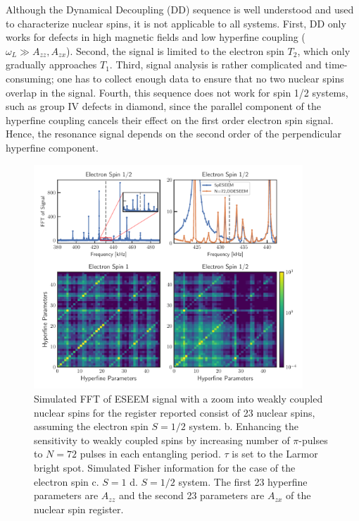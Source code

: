 \documentclass[%
 reprint,
superscriptaddress,
 amsmath,amssymb,
 aps,
]{revtex4-2}
\begin{document}
Although the Dynamical Decoupling (DD) sequence is well understood and used to characterize nuclear spins, it is not applicable to all systems.
First, DD only works for defects in high magnetic fields and low hyperfine coupling ($\omega_L \gg A_{zz}, A_{zx}$).
Second, the signal is limited to the electron spin $T_2$, which only gradually approaches $T_1$.
Third, signal analysis is rather complicated and time-consuming; one has to collect enough data to ensure that no two nuclear spins overlap in the signal.
Fourth, this sequence does not work for spin 1/2 systems, such as group IV defects in diamond, since the parallel component of the hyperfine coupling cancels their effect on the first order electron spin signal.
Hence, the resonance signal depends on the second order of the perpendicular hyperfine component.
\begin{figure}[htbp]
	\begin{center}
		\includegraphics[width=0.9\textwidth]{pict/eseem_compare2.pdf}
		\caption{Simulated FFT of ESEEM signal with a zoom into weakly coupled nuclear spins for the register reported \cite{abobeih2019atomic} consist of 23 nuclear spins, assuming the electron spin $S=1/2$ system. b. Enhancing the sensitivity to weakly coupled spins by increasing number of $\pi$-pulses to $N=72$ pulses in each entangling period. $\tau$ is set to the Larmor bright spot. Simulated Fisher information for the case of the electron spin c. $S=1$ d. $S=1/2$ system. The first 23 hyperfine parameters are $A_{zz}$ and the second 23 parameters are $A_{zx}$ of the nuclear spin register.}
		\label{fig:ddeseem}
	\end{center}
\end{figure}
\end{document}
